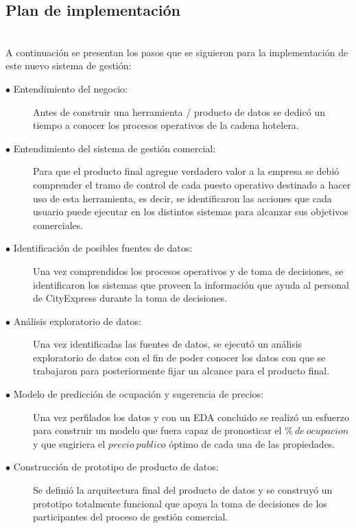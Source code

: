 \documentclass{article}\usepackage[]{graphicx}\usepackage[]{color}
\begin{document}
\subsection{Plan de implementación}
~\\
A continuación se presentan los pasos que se siguieron para la implementación de este nuevo sistema de gestión:
\begin{description}
\item [$\bullet$ Entendimiento del negocio:]  Antes de construir una herramienta / producto de datos se dedicó un tiempo a conocer los procesos operativos de la cadena hotelera.
\item [$\bullet$ Entendimiento del sistema de gestión comercial:] Para que el producto final agregue verdadero valor a la empresa se debió comprender el tramo de control de cada puesto operativo destinado a hacer uso de esta herramienta, es decir, se identificaron las acciones que cada usuario puede ejecutar en los distintos sistemas para alcanzar sus objetivos comerciales.
\item [$\bullet$ Identificación de posibles fuentes de datos:] Una vez comprendidos los procesos operativos y de toma de decisiones, se identificaron los sistemas que proveen la información que ayuda al personal de CityExpress durante la toma de decisiones.
\item [$\bullet$ Análisis exploratorio de datos:] Una vez identificadas las fuentes de datos, se ejecutó un análisis exploratorio de datos con el fin de poder conocer los datos con que se trabajaron para posteriormente fijar un alcance para el producto final.
\item [$\bullet$ Modelo de predicción de ocupación y sugerencia de precios:] Una vez perfilados los datos y con un EDA concluido se realizó un esfuerzo para construir un modelo que fuera capaz de pronosticar el $\%\ de\ ocupacion$ y que sugiriera el $precio\ publico$ óptimo de cada una de las propiedades.
\item [$\bullet$ Construcción de prototipo de producto de datos:] Se definió la arquitectura final del producto de datos y se construyó un prototipo totalmente funcional que apoya la toma de decisiones de los participantes del proceso de gestión comercial.
\end{description}
\end{document}
